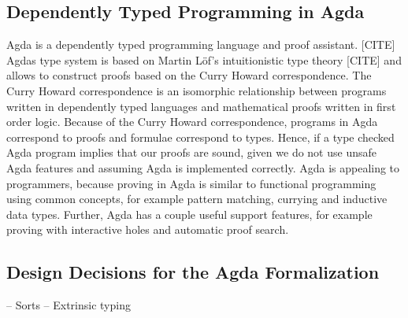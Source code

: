 \subsection{Dependently Typed Programming in Agda}
Agda is a dependently typed programming language and proof assistant. [CITE]
Agdas type system is based on Martin Löf's intuitionistic type theory [CITE] and allows to construct proofs based on the Curry Howard correspondence. 
The Curry Howard correspondence is an isomorphic relationship between programs written in dependently typed languages and mathematical proofs written in first order logic. Because of the Curry Howard correspondence, programs in Agda correspond to proofs and formulae correspond to types. 
Hence, if a type checked Agda program implies that our proofs are sound, given we do not use unsafe Agda features and assuming Agda is implemented correctly. 
Agda is appealing to programmers, because proving in Agda is similar to functional programming using common concepts, for example pattern matching, currying and inductive data types.
Further, Agda has a couple useful support features, for example proving with interactive holes and automatic proof search.
\subsection{Design Decisions for the Agda Formalization}
-- Sorts
-- Extrinsic typing
